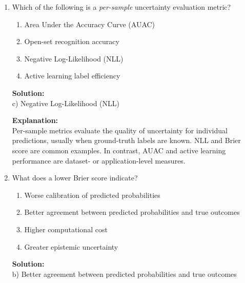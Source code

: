\documentclass{article}
\begin{document}
\begin{enumerate}
\textbf{Solution:} \\
b) To preserve meaningful distances between inputs and their latent representations

\textbf{Explanation:} \\
A Bi-Lipschitz constraint helps ensure that distances in input space are not excessively compressed or expanded in feature space. This improves the reliability of uncertainty estimates derived from latent representations because nearby samples remain nearby and distinct samples remain distinguishable.

\vspace{2mm}

\item Which of the following is a \textit{per-sample} uncertainty evaluation metric?

\begin{enumerate}
    \item Area Under the Accuracy Curve (AUAC)
    \item Open-set recognition accuracy
    \item Negative Log-Likelihood (NLL)
    \item Active learning label efficiency
\end{enumerate}

\textbf{Solution:} \\
c) Negative Log-Likelihood (NLL)

\textbf{Explanation:} \\
Per-sample metrics evaluate the quality of uncertainty for individual predictions, usually when ground-truth labels are known. NLL and Brier score are common examples. In contrast, AUAC and active learning performance are dataset- or application-level measures.

\vspace{2mm}

\item What does a lower Brier score indicate?

\begin{enumerate}
    \item Worse calibration of predicted probabilities
    \item Better agreement between predicted probabilities and true outcomes
    \item Higher computational cost
    \item Greater epistemic uncertainty
\end{enumerate}

\textbf{Solution:} \\
b) Better agreement between predicted probabilities and true outcomes


\end{enumerate}
\end{document}

